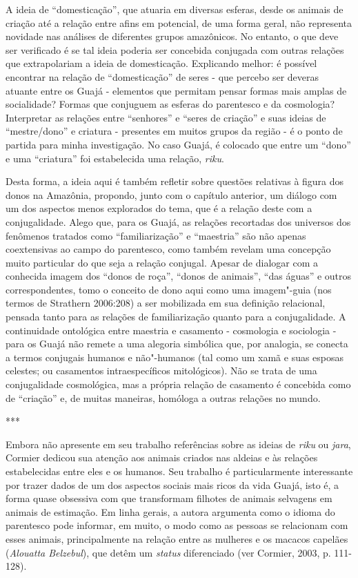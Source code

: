 A ideia de ``domesticação'', que atuaria em diversas esferas, desde os
animais de criação até a relação entre afins em potencial, de uma forma
geral, não representa novidade nas análises de diferentes grupos
amazônicos. No entanto, o que deve ser verificado é se tal ideia poderia
ser concebida conjugada com outras relações que extrapolariam a ideia de
domesticação. Explicando melhor: é possível encontrar na relação de
``domesticação'' de seres - que percebo ser deveras atuante entre os Guajá
- elementos que permitam pensar formas mais amplas de socialidade?
Formas que conjuguem as esferas do parentesco e da cosmologia?
Interpretar as relações entre ``senhores'' e ``seres de criação'' e suas
ideias de ``mestre/dono'' e criatura - presentes em muitos grupos da
região - é o ponto de partida para minha investigação. No caso Guajá, é
colocado que entre um ``dono'' e uma ``criatura'' foi estabelecida uma
relação, \emph{riku}.

Desta forma, a ideia aqui é também refletir sobre questões relativas à
figura dos donos na Amazônia, propondo, junto com o capítulo anterior,
um diálogo com um dos aspectos menos explorados do tema, que é a relação
deste com a conjugalidade. Alego que, para os Guajá, as relações
recortadas dos universos dos fenômenos tratados como ``familiarização'' e
``maestria'' são não apenas coextensivas ao campo do parentesco, como
também revelam uma concepção muito particular do que seja a relação
conjugal. Apesar de dialogar com a conhecida imagem dos ``donos de roça'',
``donos de animais'', ``das águas'' e outros correspondentes, tomo o
conceito de dono aqui como uma imagem"-guia (nos termos de Strathern
2006:208) a ser mobilizada em sua definição relacional, pensada tanto
para as relações de familiarização quanto para a conjugalidade. A
continuidade ontológica entre maestria e casamento - cosmologia e
sociologia - para os Guajá não remete a uma alegoria simbólica que, por
analogia, se conecta a termos conjugais humanos e não"-humanos (tal como
um xamã e suas esposas celestes; ou casamentos intraespecíficos
mitológicos). Não se trata de uma conjugalidade cosmológica, mas a
própria relação de casamento é concebida como de ``criação'' e, de muitas
maneiras, homóloga a outras relações no mundo.

\begin{center}
***
\end{center}

Embora não apresente em seu trabalho referências sobre as ideias de
\emph{riku} ou \emph{jara}, Cormier dedicou sua atenção aos animais
criados nas aldeias e às relações estabelecidas entre eles e os humanos.
Seu trabalho é particularmente interessante por trazer dados de um dos
aspectos sociais mais ricos da vida Guajá, isto é, a forma quase
obsessiva com que transformam filhotes de animais selvagens em animais
de estimação. Em linha gerais, a autora argumenta como o idioma do
parentesco pode informar, em muito, o modo como as pessoas se relacionam
com esses animais, principalmente na relação entre as mulheres e os
macacos capelães (\emph{Alouatta Belzebul}), que detêm um \emph{status}
diferenciado (ver Cormier, 2003, p. 111-128).

